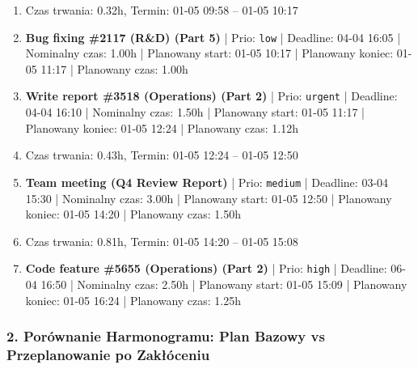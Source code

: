 {\begin{enumerate}
  \item [\textbf{PRZERWA}] Czas trwania: 0.32h, Termin: 01-05 09:58 -- 01-05 10:17
  \item [\textbf{14689}] \textbf{Bug fixing \#2117 (R\&D) (Part 5)} | Prio: \texttt{low} | Deadline: 04-04 16:05 | Nominalny czas: 1.00h | Planowany start: 01-05 10:17 | Planowany koniec: 01-05 11:17 | Planowany czas: 1.00h
  \item [\textbf{14598}] \textbf{Write report \#3518 (Operations) (Part 2)} | Prio: \texttt{urgent} | Deadline: 04-04 16:10 | Nominalny czas: 1.50h | Planowany start: 01-05 11:17 | Planowany koniec: 01-05 12:24 | Planowany czas: 1.12h
  \item [\textbf{PRZERWA}] Czas trwania: 0.43h, Termin: 01-05 12:24 -- 01-05 12:50
  \item [\textbf{14635}] \textbf{Team meeting (Q4 Review Report)} | Prio: \texttt{medium} | Deadline: 03-04 15:30 | Nominalny czas: 3.00h | Planowany start: 01-05 12:50 | Planowany koniec: 01-05 14:20 | Planowany czas: 1.50h
  \item [\textbf{PRZERWA}] Czas trwania: 0.81h, Termin: 01-05 14:20 -- 01-05 15:08
  \item [\textbf{14626}] \textbf{Code feature \#5655 (Operations) (Part 2)} | Prio: \texttt{high} | Deadline: 06-04 16:50 | Nominalny czas: 2.50h | Planowany start: 01-05 15:09 | Planowany koniec: 01-05 16:24 | Planowany czas: 1.25h
\end{enumerate}
}

\subsubsection*{2. Porównanie Harmonogramu: Plan Bazowy vs Przeplanowanie po Zakłóceniu}

